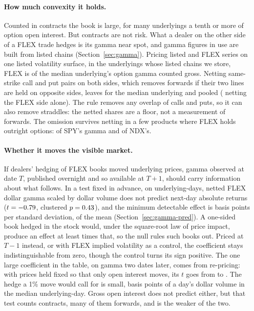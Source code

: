 \documentclass[11pt]{article}
\begin{document}
\paragraph{How much convexity it holds.} Counted in contracts the book is large, for
many underlyings a tenth or more of option open interest. But contracts are not risk. What a dealer on the
other side of a FLEX trade hedges is its gamma near spot, and gamma figures in use are
built from listed chains (Section~\ref{sec:gamma}). Pricing listed and FLEX series on one
listed volatility surface, in the \GammaUnderlyings{} underlyings whose listed chains we
store, FLEX is \GammaMedianGross{} of the median underlying's option gamma counted
gross. Netting same-strike call and put pairs on both sides, which removes forwards if
their two lines are held on opposite sides, leaves \GammaMedianBoth{} for the median
underlying and \GammaPooledBoth{} pooled (\GammaMedianNetted{} netting the FLEX side
alone). The rule removes any overlap of calls and puts, so it can also remove straddles:
the netted shares are a floor, not a measurement of forwards. The omission survives
netting in a few products where FLEX holds outright options: \GammaSPYBoth{} of SPY's
gamma and \GammaNDXBoth{} of NDX's.

\paragraph{Whether it moves the visible market.} If dealers' hedging of FLEX books
moved underlying prices, gamma observed at date $T$, published overnight and so available
at $T+1$, should carry information about what follows. In a test fixed in advance, on
\GPredDays{} underlying-days, netted FLEX dollar gamma scaled by dollar volume does not
predict next-day absolute returns ($t=-0.79$, clustered $p=0.43$), and the
minimum detectable effect is \GPredMDE{} basis points per standard deviation,
\GPredMDEShare{} of the mean (Section~\ref{sec:gamma-pred}). A one-sided book hedged in
the stock would, under the square-root law of price impact, produce an effect at least
\GCalRatio{} times that, so the null rules such books out. Priced at $T-1$ instead, or
with FLEX implied volatility as a control, the coefficient stays indistinguishable from
zero, though the control turns its sign positive. The one large coefficient in the table,
on gamma two dates later, comes from re-pricing: with prices held fixed so that only open
interest moves, its $t$ goes from \GPredLeadT{} to \GPredLeadFixedT{}. The hedge a 1\% move
would call for is small, \GPredMedianX{} basis points of a day's dollar volume in the
median underlying-day. Gross open interest does not predict either, but that test counts
contracts, many of them forwards, and is the weaker of the two.
\end{document}
